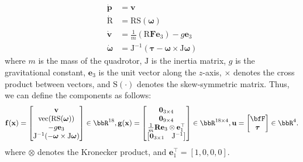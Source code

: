 \begin{equation}
\begin{aligned}
\dot{\mathbf{p}} &= \mathbf{v} \\
\dot{\mathrm{R}} &= \mathrm{R} \mathrm{S}(\boldsymbol{\omega}) \\
\dot{\mathbf{v}} &= \frac{1}{m}(\mathrm{R} \mathbf{F}\mathbf{e}_3) - g\mathbf{e}_3 \\
\dot{\boldsymbol{\omega}} &= \mathrm{J}^{-1}(\boldsymbol{\tau} - \boldsymbol{\omega} \times \mathrm{J}\boldsymbol{\omega})
\end{aligned}
\end{equation}
%
where $m$ is the mass of the quadrotor, $\mathrm{J}$ is the inertia matrix, $g$ is the gravitational constant, $\mathbf{e}_3$ is the unit vector along the $z$-axis, $\times$ denotes the cross product between vectors, and $\mathrm{S}(\cdot)$ denotes the skew-symmetric matrix. Thus, we can define the components as follows:
%
\begin{equation}
\mathbf{f}(\mathbf{x}) =
\begin{bmatrix}
\mathbf{v} \\
\mathrm{vec}(\mathrm{R}\mathrm{S}(\boldsymbol{\omega}))\\
-g\mathbf{e}_3 \\
\mathrm{J}^{-1}(- \boldsymbol{\omega} \times \mathrm{J} \boldsymbol{\omega})
\end{bmatrix} \in \bbR^{18},
\mathbf{g}(\mathbf{x}) =
\begin{bmatrix}
\mathbf{0}_{3 \times 4} \\
\mathbf{0}_{9 \times 4} \\
\frac{1}{m}\mathbf{R} \mathbf{e}_3 \otimes \mathbf{e}_1^\top \\
\begin{bmatrix}
\mathbf{0}_{3 \times 1} & \mathrm{J}^{-1}
\end{bmatrix}
\end{bmatrix} \in \bbR^{18 \times 4},
\mathbf{u} =
\begin{bmatrix}
\bfF \\
\boldsymbol{\tau}
\end{bmatrix} \in \bbR^{4}. \notag
\end{equation}
%
where $\otimes$ denotes the Kronecker product, and $\mathbf{e}_1^\top = [1, 0, 0, 0]$. 

